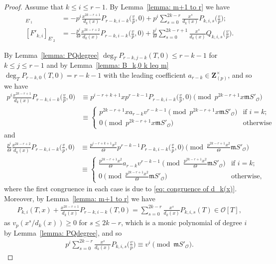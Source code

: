 \documentclass[11pt]{amsart}
\theoremstyle{definition}
\numberwithin{equation}{subsection}
\theoremstyle{plain}
\theoremstyle{plain}
\theoremstyle{plain}
\theoremstyle{plain}
\theoremstyle{plain}
\theoremstyle{plain}
\theoremstyle{plain}
\theoremstyle{plain}
\theoremstyle{plain}
\theoremstyle{plain}
\theoremstyle{plain}
\theoremstyle{plain}
\theoremstyle{definition}
\theoremstyle{definition}
\theoremstyle{definition}
\theoremstyle{remark}
\renewcommand{\(}{\textup{(}}
\renewcommand{\)}{\textup{)}}
\newcommand{\Z}{\mathbf{Z}}
\newcommand{\fm}{\mathfrak{m}}
\newcommand{\cO}{\mathcal{O}}
\begin{document}
\begin{proof}
Assume that $k\leq i\leq r-1$. By Lemma~\ref{lemma: m+1 to r} we have
\begin{align*}
[F'_{k,i}]_{E'_1}&=
    -p^i\frac{x^{2k-r+1}}{d_k(x)}P_{r-k,i-k}\Big(\frac{v}{p},0\Big)
    +p^i\sum_{s=0}^{2k-r}\frac{x^s}{d_k(x)}P_{k,i,s}\Big(\frac{v}{p}\Big);\\
[F'_{k,i}]_{E'_2}&=
    -\frac{p^i}{\Theta}\frac{x^{2k-r+2}}{d_k(x)}P_{r-k,i-k}\Big(\frac{v}{p},0\Big)
    +\frac{p^i}{\Theta}\sum_{s=0}^{2k-r+1}\frac{x^s}{d_k(x)}Q_{k,i,s}\Big(\frac{v}{p}\Big).
\end{align*}

By Lemma~\ref{lemma: PQdegree} $\deg_T P_{r-k,j-k}(T,0)\leq r-k-1$ for $k\leq j\leq r-1$ and by Lemma~\ref{lemma: B_k,0 k leq m} $\deg_TP_{r-k,0}(T,0)=r-k-1$ with the leading coefficient $a_{r-k}\in\Z_{(p)}^\times$, and so we have
\begin{align*}
    p^i \frac{x^{2k-r+1}}{d_k(x)} P_{r-k,i-k}\Big(\frac{v}{p},0\Big)
    &\equiv
    p^{i-r+k+1}x p^{r-k-1}P_{r-k,i-k}\Big(\frac{v}{p},0\Big)\pmod{p^{2k-r+1}x\fm S'_\cO}\\
    &\equiv
    \begin{cases}
        p^{2k-r+1}xa_{r-k}v^{r-k-1}\pmod{p^{2k-r+1}x\fm S'_\cO} & \mbox{if } i=k; \\
        0\pmod{p^{2k-r+1}x\fm S'_\cO} & \mbox{otherwise}
    \end{cases}
\end{align*}
and
\begin{align*}
    \frac{p^i}{\Theta}\frac{x^{2k-r+2}}{d_k(x)} P_{r-k,i-k}\Big(\frac{v}{p},0\Big)
    &\equiv
    \frac{p^{i-r+k+1}x^2}{\Theta}p^{r-k-1}P_{r-k,i-k}\Big(\frac{v}{p},0\Big)\pmod{\frac{p^{2k-r+1}x^2}{\Theta}\fm S'_\cO}\\
    &\equiv
    \begin{cases}
        \frac{p^{2k-r+1}x^2}{\Theta}a_{r-k}v^{r-k-1}\pmod{\frac{p^{2k-r+1}x^2}{\Theta}\fm S'_\cO} & \mbox{if } i=k; \\
        0\pmod{\frac{p^{2k-r+1}x^2}{\Theta}\fm S'_\cO} & \mbox{otherwise,}
    \end{cases}
\end{align*}
where the first congruence in each case is due to \eqref{eq: congruence of d_k(x)}. Moreover, by Lemma~\ref{lemma: m+1 to r} we have
\begin{align*}
    P_{k,i}(T,x)+\frac{x^{2k-r+1}}{d_k(x)}P_{r-k,i-k}(T,0)
    =\sum_{s=0}^{2k-r}\frac{x^s}{d_k(x)}P_{k,i,s}(T) \in\cO[T],
\end{align*}
as $v_p(x^s/d_k(x))\geq 0$ for $s\leq 2k-r$, which is a monic polynomial of degree $i$ by Lemma~\ref{lemma: PQdegree}, and so
\begin{align*}
    p^i\sum_{s=0}^{2k-r}\frac{x^s}{d_k(x)}P_{k,i,s}\Big(\frac{v}{p}\Big)
    \equiv v^i \pmod{\fm S'_\cO}.
\end{align*}





\end{proof}
\end{document}
